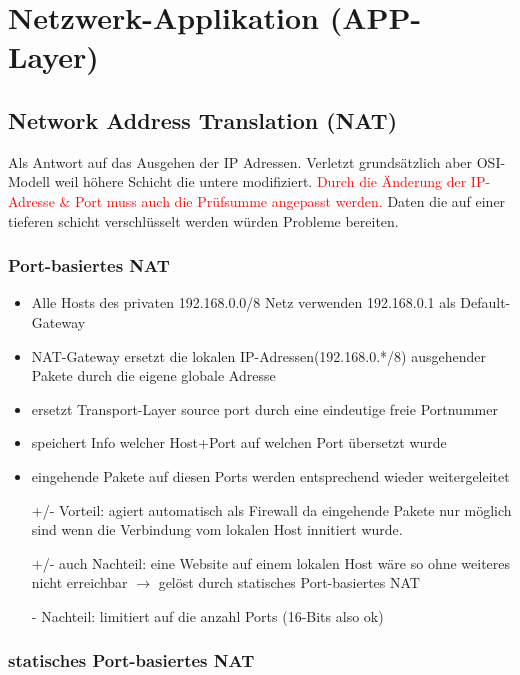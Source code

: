 \section{Netzwerk-Applikation (APP-Layer)}

\subsection{Network Address Translation (NAT)}

Als Antwort auf das Ausgehen der IP Adressen. Verletzt grundsätzlich aber
OSI-Modell weil höhere Schicht die untere modifiziert. \textcolor{red}{Durch die
Änderung der IP-Adresse \& Port muss auch die Prüfsumme angepasst werden.}
Daten die auf einer tieferen schicht verschlüsselt werden würden Probleme bereiten.

\subsubsection{Port-basiertes NAT}
\begin{itemize}
    \item Alle Hosts des privaten 192.168.0.0/8 Netz verwenden 192.168.0.1 
        als Default-Gateway
    \item NAT-Gateway ersetzt die lokalen IP-Adressen(192.168.0.*/8) ausgehender 
        Pakete durch die eigene globale Adresse
    \item ersetzt Transport-Layer source port durch eine eindeutige freie Portnummer
    \item speichert Info welcher Host+Port auf welchen Port übersetzt wurde
    \item eingehende Pakete auf diesen Ports werden entsprechend wieder weitergeleitet
    \item[+/-] Vorteil: agiert automatisch als Firewall da eingehende Pakete nur 
        möglich sind wenn die Verbindung vom lokalen Host innitiert wurde.
    \item[+/-] auch Nachteil: eine Website auf einem lokalen Host wäre so ohne weiteres
        nicht erreichbar $\rightarrow$ gelöst durch statisches Port-basiertes NAT
    \item[-] Nachteil: limitiert auf die anzahl Ports (16-Bits also ok)
\end{itemize}


\subsubsection{statisches Port-basiertes NAT}

